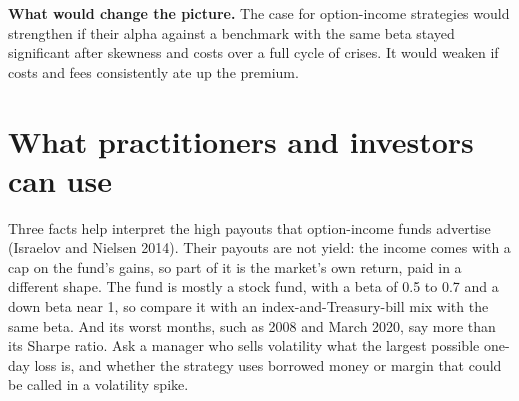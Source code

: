 \textbf{What would change the picture.} The case for option-income strategies would strengthen if their alpha against a benchmark with the same beta stayed significant after skewness and costs over a full cycle of crises. It would weaken if costs and fees consistently ate up the premium.

\section{What practitioners and investors can use}
\label{sec:16-investors}

Three facts help interpret the high payouts that option-income funds advertise (Israelov and Nielsen 2014). Their payouts are not yield: the income comes with a cap on the fund's gains, so part of it is the market's own return, paid in a different shape. The fund is mostly a stock fund, with a beta of 0.5 to 0.7 and a down beta near 1, so compare it with an index-and-Treasury-bill mix with the same beta. And its worst months, such as 2008 and March 2020, say more than its Sharpe ratio. Ask a manager who sells volatility what the largest possible one-day loss is, and whether the strategy uses borrowed money or margin that could be called in a volatility spike.

\makeatletter
{}
\makeatother

